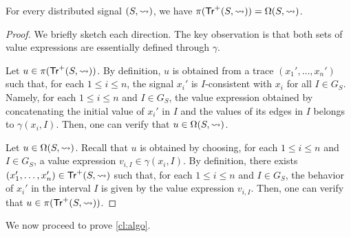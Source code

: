 \begin{lemma} \label{cl:eq}
	For every distributed signal $(S,{\rightsquigarrow})$, we have $\pi(\mathsf{Tr}^+(S,{\rightsquigarrow})) = \Omega(S,{\rightsquigarrow})$.
\end{lemma}
\begin{proof}
	We briefly sketch each direction.
	The key observation is that both sets of value expressions are essentially defined through $\gamma$.

	Let $u \in \pi(\mathsf{Tr}^+(S,{\rightsquigarrow}))$.
	By definition, $u$ is obtained from a trace $(x_1', \ldots, x_n')$ such that, for each $1 \leq i \leq n$, the signal $x_i'$ is $I$-consistent with $x_i$ for all $I \in G_S$.
	Namely, for each $1 \leq i \leq n$ and $I \in G_S$, the value expression obtained by concatenating the initial value of $x_i'$ in $I$ and the values of its edges in $I$ belongs to $\gamma(x_i, I)$.
	Then, one can verify that $u \in \Omega(S,{\rightsquigarrow})$.

	Let $u \in \Omega(S,{\rightsquigarrow})$.
	Recall that $u$ is obtained by choosing, for each $1 \leq i \leq n$ and $I \in G_S$, a value expression $v_{i,I} \in \gamma(x_i, I)$.
	By definition, there exists $(x_1', \ldots, x_n') \in \mathsf{Tr}^+(S,{\rightsquigarrow})$ such that, for each $1 \leq i \leq n$ and $I \in G_S$, the behavior of $x_i'$ in the interval $I$ is given by the value expression $v_{i,I}$.
	Then, one can verify that $u \in \pi(\mathsf{Tr}^+(S,{\rightsquigarrow}))$.
\end{proof}

We now proceed to prove \cref{cl:algo}.

